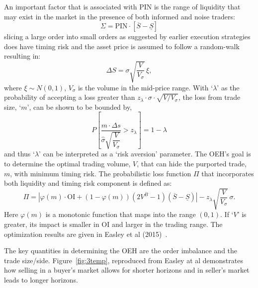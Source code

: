 An important factor that is associated with PIN is the range of liquidity that may exist in the market in the presence of both informed and noise traders:
	\begin{equation}\label{eqn:newsigma}
	\Sigma = \text{PIN} \cdot [\overline{S} - \underline{S}]
	\end{equation}
slicing a large order into small orders as suggested by earlier execution strategies does have timing risk and the asset price is assumed to follow a random-walk resulting in:
	\begin{equation}\label{eqn:randomwalk}
	\Delta S= \sigma \sqrt{\dfrac{V}{V_\sigma}} \, \xi,
	\end{equation}
where $\xi \sim N(0,1)$, $V_\sigma$ is the volume in the mid-price range. With `$\lambda$' as the probability of accepting a loss greater than $z_\lambda \cdot \sigma \cdot \sqrt{V/V_\sigma}$, the loss from trade size, `$m$', can be shown to be bounded by,
	\begin{equation}\label{eqn:bigbracp}
	P \left[ \dfrac{m \cdot \Delta s}{\hat{\sigma} \sqrt{\dfrac{V}{V_\sigma}}} > z_\lambda \right] = 1-\lambda
	\end{equation}
and thus `$\lambda$' can be interpreted as a `risk aversion' parameter. The OEH's goal is to determine the optimal trading volume, $V$, that can hide the purported trade, $m$, with minimum timing risk. The probabilistic loss function $\Pi$ that incorporates both liquidity and timing risk component is defined as:
	\begin{equation}\label{eqn:pi}
	\Pi = \left| \varphi(m) \cdot \text{OI} + (1-\varphi(m)) (2V^B-1)(\overline{S}-\underline{S})\right| - z_\lambda \sqrt{\dfrac{V}{V_\sigma}} \, \sigma.
	\end{equation}
Here $\varphi(m)$ is a monotonic function that maps into the range $(0,1)$. If `$V$' is greater, its impact is smaller in OI and larger in the trading range. The optimization results are given in Easley et al (2015)~\cite{prado2}.


The key quantities in determining the OEH are the order imbalance and the trade size/side. Figure~\ref{fig:3temp}, reproduced from Easley at al demonstrates how selling in a buyer's market allows for shorter horizons and in seller's market leads to longer horizons.  


